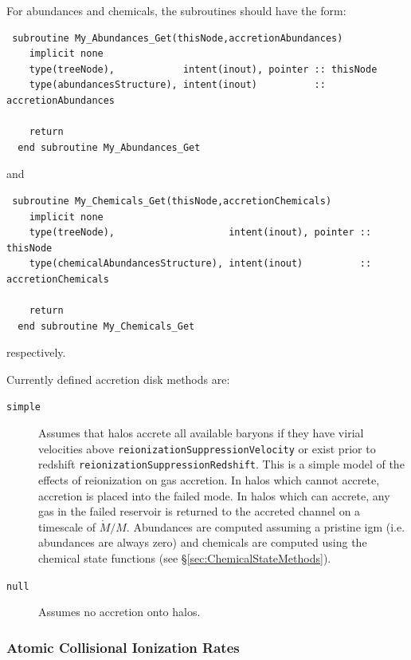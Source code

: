 For abundances and chemicals, the subroutines should have the form:
\begin{verbatim}
 subroutine My_Abundances_Get(thisNode,accretionAbundances)
    implicit none
    type(treeNode),            intent(inout), pointer :: thisNode
    type(abundancesStructure), intent(inout)          :: accretionAbundances

    return
  end subroutine My_Abundances_Get
\end{verbatim}
and
\begin{verbatim}
 subroutine My_Chemicals_Get(thisNode,accretionChemicals)
    implicit none
    type(treeNode),                    intent(inout), pointer :: thisNode
    type(chemicalAbundancesStructure), intent(inout)          :: accretionChemicals

    return
  end subroutine My_Chemicals_Get
\end{verbatim}
respectively.

Currently defined accretion disk methods are:
\begin{description}
 \item [{\tt simple}] Assumes that halos accrete all available baryons if they have virial velocities above {\tt reionizationSuppressionVelocity} or exist prior to redshift {\tt reionizationSuppressionRedshift}. This is a simple model of the effects of reionization on gas accretion. In halos which cannot accrete, accretion is placed into the failed mode. In halos which can accrete, any gas in the failed reservoir is returned to the accreted channel on a timescale of $\dot{M}/M$. Abundances are computed assuming a pristine \gls{igm} (i.e. abundances are always zero) and chemicals are computed using the chemical state functions (see \S\ref{sec:ChemicalStateMethods}).
 \item [{\tt null}] Assumes no accretion onto halos.
\end{description}

\subsubsection{Atomic Collisional Ionization Rates}

